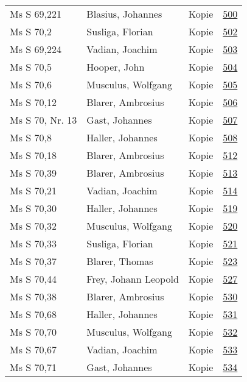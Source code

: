 \documentclass[10pt,a4paper,landscape]{report}
\begin{document}
\begin{longtable}{p{16cm}p{4cm}lr}
Ms S 69,221	&	Blasius, Johannes	&	Kopie	&	\href{http://130.60.24.72/assignment/500}{500}\\
Ms S 70,2	&	Susliga, Florian	&	Kopie	&	\href{http://130.60.24.72/assignment/502}{502}\\
Ms S 69,224	&	Vadian, Joachim	&	Kopie	&	\href{http://130.60.24.72/assignment/503}{503}\\
Ms S 70,5	&	Hooper, John	&	Kopie	&	\href{http://130.60.24.72/assignment/504}{504}\\
Ms S 70,6	&	Musculus, Wolfgang	&	Kopie	&	\href{http://130.60.24.72/assignment/505}{505}\\
Ms S 70,12	&	Blarer, Ambrosius	&	Kopie	&	\href{http://130.60.24.72/assignment/506}{506}\\
Ms S 70, Nr. 13	&	Gast, Johannes	&	Kopie	&	\href{http://130.60.24.72/assignment/507}{507}\\
Ms S 70,8	&	Haller, Johannes	&	Kopie	&	\href{http://130.60.24.72/assignment/508}{508}\\
Ms S 70,18	&	Blarer, Ambrosius	&	Kopie	&	\href{http://130.60.24.72/assignment/512}{512}\\
Ms S 70,39	&	Blarer, Ambrosius	&	Kopie	&	\href{http://130.60.24.72/assignment/513}{513}\\
Ms S 70,21	&	Vadian, Joachim	&	Kopie	&	\href{http://130.60.24.72/assignment/514}{514}\\
Ms S 70,30	&	Haller, Johannes	&	Kopie	&	\href{http://130.60.24.72/assignment/519}{519}\\
Ms S 70,32	&	Musculus, Wolfgang	&	Kopie	&	\href{http://130.60.24.72/assignment/520}{520}\\
Ms S 70,33	&	Susliga, Florian	&	Kopie	&	\href{http://130.60.24.72/assignment/521}{521}\\
Ms S 70,37	&	Blarer, Thomas	&	Kopie	&	\href{http://130.60.24.72/assignment/523}{523}\\
Ms S 70,44	&	Frey, Johann Leopold	&	Kopie	&	\href{http://130.60.24.72/assignment/527}{527}\\
Ms S 70,38	&	Blarer, Ambrosius	&	Kopie	&	\href{http://130.60.24.72/assignment/530}{530}\\
Ms S 70,68	&	Haller, Johannes	&	Kopie	&	\href{http://130.60.24.72/assignment/531}{531}\\
Ms S 70,70	&	Musculus, Wolfgang	&	Kopie	&	\href{http://130.60.24.72/assignment/532}{532}\\
Ms S 70,67	&	Vadian, Joachim	&	Kopie	&	\href{http://130.60.24.72/assignment/533}{533}\\
Ms S 70,71	&	Gast, Johannes	&	Kopie	&	\href{http://130.60.24.72/assignment/534}{534}\\

\end{longtable}
\end{document}

